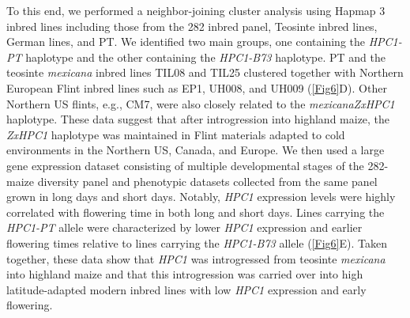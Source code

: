 \documentclass[9pt,twocolumn,twoside,lineno]{biorxiv}
\newcommand{\mex}{\textit{mexicana}\xspace}
\newcommand{\hpc}{\textit{HPC1}\xspace}
\begin{document}
To this end, we performed a neighbor-joining cluster analysis using Hapmap 3 \cite{Bukowski2017-ng} inbred lines including those from the 282 inbred panel, Teosinte inbred lines, German lines, and PT. 
We identified two main groups, one containing the \textit{HPC1-PT} haplotype and the other containing the \textit{HPC1-B73} haplotype.
PT and the teosinte \mex inbred lines TIL08 and TIL25 clustered together with Northern European Flint inbred lines such as EP1, UH008, and UH009 (\cref{Fig6}D). 
Other Northern US flints, e.g., CM7, were also closely related to the \mex \textit{ZxHPC1} haplotype. 
These data suggest that after introgression into highland maize, the \textit{ZxHPC1} haplotype was maintained in Flint materials adapted to cold environments in the Northern US, Canada, and Europe. 
We then used a large gene expression dataset consisting of multiple developmental stages of the 282-maize diversity panel \cite{Kremling2018-gn} and phenotypic datasets collected from the same panel grown in long days and short days.
Notably, \hpc expression levels were highly correlated with flowering time in both long and short days. 
Lines carrying the \textit{HPC1-PT} allele were characterized by lower \hpc expression and earlier flowering times relative to lines carrying the \textit{HPC1-B73} allele (\cref{Fig6}E).
Taken together, these data show that \hpc was introgressed from teosinte \mex into highland maize and that this introgression was carried over into high latitude-adapted modern inbred lines with low \hpc expression and early flowering.
\end{document}

